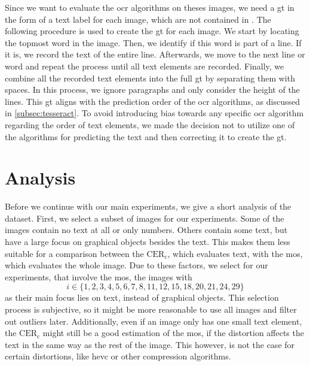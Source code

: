 Since we want to evaluate the \gls{ocr} algorithms on theses images, we need a \gls{gt} in the form of a text label for each image, which are not contained in \cite{ni_esim_2017}.
The following procedure is used to create the \gls{gt} for each image.
We start by locating the topmost word in the image.
Then, we identify if this word is part of a line.
If it is, we record the text of the entire line.
Afterwards, we move to the next line or word and repeat the process until all text elements are recorded.
Finally, we combine all the recorded text elements into the full \gls{gt} by separating them with spaces.
In this process, we ignore paragraphs and only consider the height of the lines.
This \gls{gt} aligns with the prediction order of the \gls{ocr} algorithms, as discussed in \autoref{subsec:tesseract}.
To avoid introducing bias towards any specific \gls{ocr} algorithm regarding the order of text elements, we made the decision not to utilize one of the algorithms for predicting the text and then correcting it to create the \gls{gt}.



\section{Analysis}
\label{sec:dataset_analysis}


Before we continue with our main experiments, we give a short analysis of the dataset.
First, we select a subset of images for our experiments.
Some of the images contain no text at all or only numbers.
Others contain some text, but have a large focus on graphical objects besides the text.
This makes them less suitable for a comparison between the $\text{CER}_{\text{c}}$, which evaluates text, with the \gls{mos}, which evaluates the whole image.
Due to these factors, we select for our experiments, that involve the \gls{mos}, the images with
\begin{equation}
    i \in \{1, 2, 3, 4, 5, 6, 7, 8, 11, 12, 15, 18, 20, 21, 24, 29\}
    \label{eq:mos_images}
\end{equation}
as their main focus lies on text, instead of graphical objects.
This selection process is subjective, so it might be more reasonable to use all images and filter out outliers later.
Additionally, even if an image only has one small text element, the $\text{CER}_{\text{c}}$ might still be a good estimation of the \gls{mos}, if the distortion affects the text in the same way as the rest of the image.
This however, is not the case for certain distortions, like \gls{hevc} or other compression algorithms.

